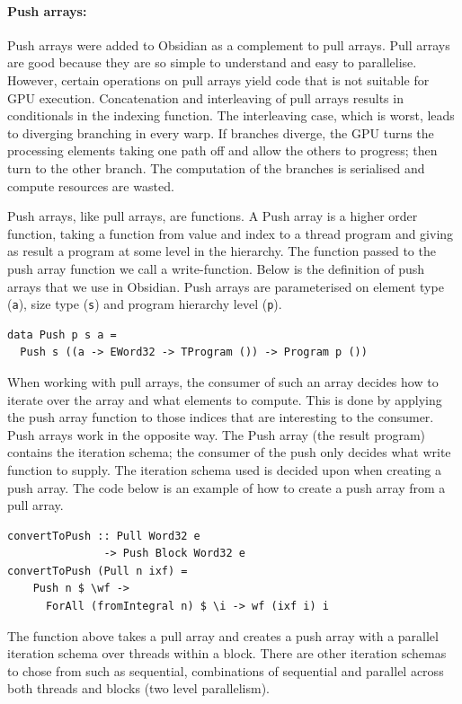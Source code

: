 \documentclass[a4paper]{book}
\begin{document}
 
\paragraph{Push arrays:}

Push arrays were added to Obsidian as a complement to pull arrays. Pull arrays are 
good because they are so simple to understand and easy to parallelise. However, certain
operations on pull arrays yield code that is not suitable for GPU execution. Concatenation 
and interleaving of pull arrays results in conditionals in the indexing function. The 
interleaving case, which is worst, leads to diverging branching in every warp. If branches 
diverge, the GPU turns the processing elements taking one path off and 
allow the others to progress; then turn to the other branch. The computation of the 
branches is serialised and compute resources are wasted. 

Push arrays, like pull arrays, are functions. A Push array is a higher order 
function, taking a function from value and index to a thread program and giving 
as result a program at some level in the hierarchy. The function passed to the 
push array function we call a write-function. Below is the definition of 
push arrays that we use in Obsidian. Push arrays are parameterised on element 
type ({\tt a}), size type ({\tt s}) and program hierarchy level ({\tt p}). 

\begin{verbatim}
data Push p s a =
  Push s ((a -> EWord32 -> TProgram ()) -> Program p ())
\end{verbatim} 

When working with pull arrays, the consumer of such an array decides how to 
iterate over the array and what elements to compute. This is done by applying the 
push array function to those indices that are interesting to the consumer. Push 
arrays work in the opposite way. The Push array (the result program) contains 
the iteration schema; the consumer of the push only decides what write function 
to supply. The iteration schema used is decided upon when creating a push array. 
The code below is an example of how to create a push array from a pull array.

\begin{verbatim} 
convertToPush :: Pull Word32 e 
               -> Push Block Word32 e 
convertToPush (Pull n ixf) =
    Push n $ \wf -> 
      ForAll (fromIntegral n) $ \i -> wf (ixf i) i
\end{verbatim} 

The function above takes a pull array and creates a push array with a parallel 
iteration schema over threads within a block. There are other iteration schemas to 
chose from such as sequential, combinations of sequential and parallel
across both threads and blocks (two level parallelism). 
\end{document}
